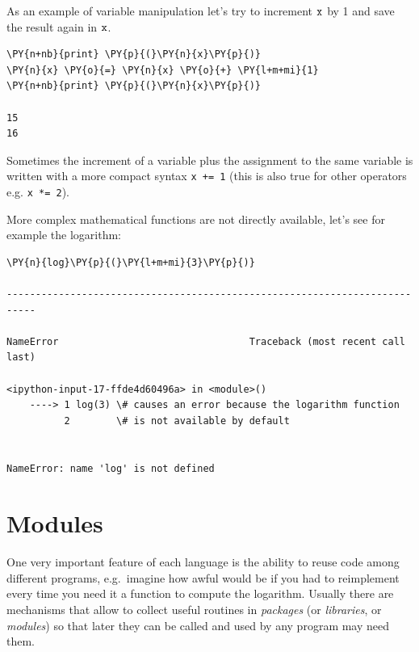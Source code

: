 As an example of variable manipulation let's try to increment \(\tt{x}\) by 1 and save the result again in \(\tt{x}\).

\begin{tcolorbox}[breakable, size=fbox, boxrule=1pt, pad at break*=1mm, colback=cellbackground, colframe=cellborder]            
\begin{Verbatim}[commandchars=\\\{\}]
\PY{n+nb}{print} \PY{p}{(}\PY{n}{x}\PY{p}{)}
\PY{n}{x} \PY{o}{=} \PY{n}{x} \PY{o}{+} \PY{l+m+mi}{1}
\PY{n+nb}{print} \PY{p}{(}\PY{n}{x}\PY{p}{)}

15
16
\end{Verbatim}
\end{tcolorbox}

Sometimes the increment of a variable plus the assignment to the same variable is written with a more compact syntax \texttt{x += 1} (this is also true for other operators e.g. \texttt{x *= 2}).

More complex mathematical functions are not directly available, let's see for example the logarithm:

\begin{tcolorbox}[breakable, size=fbox, boxrule=1pt, pad at break*=1mm, colback=cellbackground, colframe=cellborder]            
\begin{Verbatim}[commandchars=\\\{\}]
\PY{n}{log}\PY{p}{(}\PY{l+m+mi}{3}\PY{p}{)}

---------------------------------------------------------------------------

NameError                                 Traceback (most recent call last)

<ipython-input-17-ffde4d60496a> in <module>()
    ----> 1 log(3) \# causes an error because the logarithm function
          2        \# is not available by default


NameError: name 'log' is not defined
\end{Verbatim}
\end{tcolorbox}

\section{Modules}\label{modules}

One very important feature of each language is the ability to reuse code among different programs, e.g.~imagine how awful would be if you had to reimplement every time you need it a function to compute the logarithm.
Usually there are mechanisms that allow to collect useful routines in \emph{packages} (or \emph{libraries}, or \emph{modules}) so that later they can be called and used by any program may need them.

